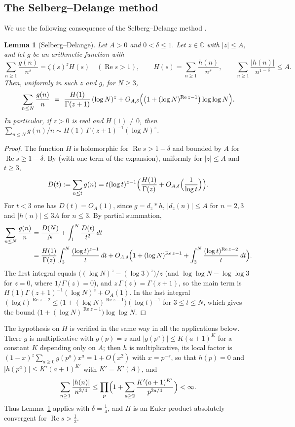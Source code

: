 \documentclass[11pt]{amsart}
\newtheorem{lemma}[theorem]{Lemma}
\theoremstyle{definition}
\newcommand{\re}{\operatorname{Re}}
\newcommand{\half}{\tfrac12}
\newcommand{\loglog}{\log\log}
\begin{document}
\subsection{The Selberg--Delange method}
We use the following consequence of the Selberg--Delange method \cite[Ch.~II.5]{Tenenbaum}.

\begin{lemma}[Selberg--Delange]\label{lem:lsd}
Let $A>0$ and $0<\delta\le1$. Let $z\in\mathbb C$ with $|z|\le A$, and let $g$ be an arithmetic function with
\[
\sum_{n\ge1}\frac{g(n)}{n^{s}}=\zeta(s)^z H(s)\quad(\re s>1),\qquad
H(s)=\sum_{n\ge1}\frac{h(n)}{n^{s}},\qquad \sum_{n\ge1}\frac{|h(n)|}{n^{1-\delta}}\le A .
\]
Then, uniformly in such $z$ and $g$, for $N\ge3$,
\[
\sum_{n\le N}\frac{g(n)}{n}\ =\ \frac{H(1)}{\Gamma(z+1)}\,(\log N)^{z}
+O_{A,\delta}\Bigl(\bigl(1+(\log N)^{\re z-1}\bigr)\loglog N\Bigr).
\]
In particular, if $z>0$ is real and $H(1)\ne0$, then
$\sum_{n\le N}g(n)/n\sim H(1)\,\Gamma(z+1)^{-1}(\log N)^{z}$.
\end{lemma}
\begin{proof}
The function $H$ is holomorphic for $\re s>1-\delta$ and bounded by $A$ for $\re s\ge1-\delta$. By
\cite[Thm.~II.5.2]{Tenenbaum} (with one term of the expansion), uniformly for $|z|\le A$ and $t\ge3$,
\[
D(t):=\sum_{n\le t}g(n)=t(\log t)^{z-1}\Bigl(\frac{H(1)}{\Gamma(z)}+O_{A,\delta}\Bigl(\frac1{\log t}\Bigr)\Bigr).
\]
For $t<3$ one has $D(t)=O_A(1)$, since $g=d_z*h$, $|d_z(n)|\le A$ for $n=2,3$ and $|h(n)|\le3A$ for $n\le3$.
By partial summation,
\[
\begin{aligned}
\sum_{n\le N}\frac{g(n)}{n}&=\frac{D(N)}{N}+\int_1^N\frac{D(t)}{t^2}\,dt\\
&=\frac{H(1)}{\Gamma(z)}\int_3^N\frac{(\log t)^{z-1}}{t}\,dt
+O_{A,\delta}\Bigl(1+(\log N)^{\re z-1}+\int_3^N\frac{(\log t)^{\re z-2}}{t}\,dt\Bigr).
\end{aligned}
\]
The first integral equals $\bigl((\log N)^z-(\log3)^z\bigr)/z$ (and $\loglog N-\loglog3$ for $z=0$, where
$1/\Gamma(z)=0$), and $z\,\Gamma(z)=\Gamma(z+1)$, so the main term is
$H(1)\Gamma(z+1)^{-1}(\log N)^z+O_A(1)$. In the last integral
$(\log t)^{\re z-2}\le\bigl(1+(\log N)^{\re z-1}\bigr)(\log t)^{-1}$ for $3\le t\le N$, which gives the bound
$\bigl(1+(\log N)^{\re z-1}\bigr)\loglog N$.
\end{proof}

The hypothesis on $H$ is verified in the same way in all the applications below. There $g$ is multiplicative
with $g(p)=z$ and $|g(p^a)|\le K(a+1)^K$ for a constant $K$ depending only on $A$; then $h$ is multiplicative,
its local factor is $(1-x)^z\sum_{a\ge0}g(p^a)x^a=1+O(x^2)$ with $x=p^{-s}$, so that $h(p)=0$ and
$|h(p^a)|\le K'(a+1)^{K'}$ with $K'=K'(A)$, and
\[
\sum_{n\ge1}\frac{|h(n)|}{n^{3/4}}\le\prod_p\Bigl(1+\sum_{a\ge2}\frac{K'(a+1)^{K'}}{p^{3a/4}}\Bigr)<\infty .
\]
Thus Lemma~\ref{lem:lsd} applies with $\delta=\tfrac14$, and $H$ is an Euler product absolutely convergent for
$\re s>\half$.
\end{document}
